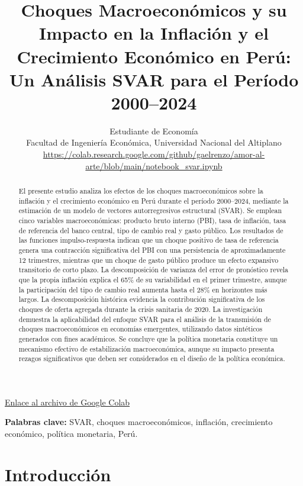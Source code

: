 \documentclass[12pt,a4paper]{article}
\title{\textbf{Choques Macroeconómicos y su Impacto en la Inflación y el Crecimiento Económico en Perú: Un Análisis SVAR para el Período 2000--2024}}
\author{
    Estudiante de Economía\\
    Facultad de Ingeniería Económica, Universidad Nacional del Altiplano\\
    \url{https://colab.research.google.com/github/gaelrenzo/amor-al-arte/blob/main/notebook_svar.ipynb}
}
\date{}
\begin{document}
\maketitle

\begin{center}
\href{https://colab.research.google.com/github/gaelrenzo/amor-al-arte/blob/main/notebook_svar.ipynb}{Enlace al archivo de Google Colab}
\end{center}

\begin{abstract}
El presente estudio analiza los efectos de los choques macroeconómicos sobre la inflación y el crecimiento económico en Perú durante el período 2000--2024, mediante la estimación de un modelo de vectores autorregresivos estructural (SVAR). Se emplean cinco variables macroeconómicas: producto bruto interno (PBI), tasa de inflación, tasa de referencia del banco central, tipo de cambio real y gasto público. Los resultados de las funciones impulso-respuesta indican que un choque positivo de tasa de referencia genera una contracción significativa del PBI con una persistencia de aproximadamente 12 trimestres, mientras que un choque de gasto público produce un efecto expansivo transitorio de corto plazo. La descomposición de varianza del error de pronóstico revela que la propia inflación explica el 65\% de su variabilidad en el primer trimestre, aunque la participación del tipo de cambio real aumenta hasta el 28\% en horizontes más largos. La descomposición histórica evidencia la contribución significativa de los choques de oferta agregada durante la crisis sanitaria de 2020. La investigación demuestra la aplicabilidad del enfoque SVAR para el análisis de la transmisión de choques macroeconómicos en economías emergentes, utilizando datos sintéticos generados con fines académicos. Se concluye que la política monetaria constituye un mecanismo efectivo de estabilización macroeconómica, aunque su impacto presenta rezagos significativos que deben ser considerados en el diseño de la política económica.
\end{abstract}

\vspace{0.5cm}
\noindent\textbf{Palabras clave:} SVAR, choques macroeconómicos, inflación, crecimiento económico, política monetaria, Perú.

\section{Introducción}
\end{document}
